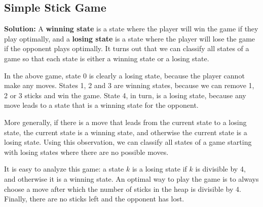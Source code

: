 \documentclass[12pt]{article}
\begin{document}
\subsection{Simple Stick Game}
\textbf{Solution:}
A \textbf{winning state} is a state where the player will win the game if they play optimally, and a \textbf{losing state} is a state where the player will lose the game if the opponent plays optimally. It turns out that we can classify all states of a game so that each state is either a winning state or a losing state.

In the above game, state 0 is clearly a losing state, because the player cannot make any moves. States 1, 2 and 3 are winning states, because we can remove 1, 2 or 3 sticks and win the game. State 4, in turn, is a losing state, because any
move leads to a state that is a winning state for the opponent.

More generally, if there is a move that leads from the current state to a losing state, the current state is a winning state, and otherwise the current state is a
losing state. Using this observation, we can classify all states of a game starting with losing states where there are no possible moves.

It is easy to analyze this game: a state $k$ is a losing state if $k$ is divisible by
4, and otherwise it is a winning state. An optimal way to play the game is to always choose a move after which the number of sticks in the heap is divisible by 4. Finally, there are no sticks left and the opponent has lost.
\end{document}
